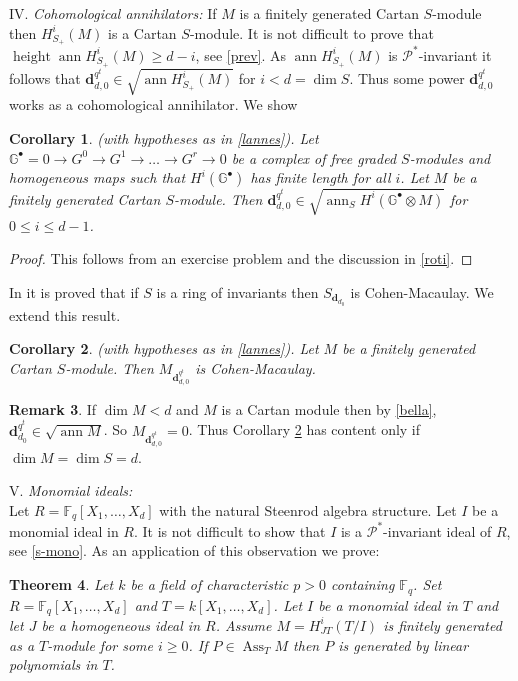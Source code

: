 \documentclass{amsart}
\newcommand{\CM}{Cohen-Macaulay}
\newcommand{\F}{\mathbb{F} }
\newcommand{\Pc}{\mathcal{P} }
\newcommand{\db}{\mathbf{d} }
\newcommand{\rt}{\rightarrow}
\newcommand{\G}{\mathbb{G}^\bullet }
\newcommand{\height}{\operatorname{height}}
\newcommand{\ann}{\operatorname{ann}}
\newcommand{\Ass}{\operatorname{Ass}}
\theoremstyle{plain}
\newtheorem{theorem}{Theorem}[section]
\newtheorem{corollary}[theorem]{Corollary}
\theoremstyle{definition}
\newtheorem{remark}[theorem]{Remark}
\theoremstyle{remark}
\begin{document}
IV. \emph{Cohomological annihilators:}
\s \label{roti} If $M$ is a finitely generated Cartan $S$-module then  $H^i_{S_+}(M)$ is a Cartan $S$-module. It is not difficult to prove that $\height \ann H^i_{S_+}(M) \geq d -i$, see \ref{prev}. As $\ann H^i_{S_+}(M)$ is $\Pc^*$-invariant it follows that $\db_{d,0}^{q^t} \in \sqrt{\ann H^i_{S_+}(M)} $ for $i < d = \dim S$. Thus some power $\db_{d,0}^{q^t}$ works as a cohomological annihilator. We show
\begin{corollary}
\label{rob} (with hypotheses as in \ref{lannes}). Let $\G = 0 \rt G^0 \rt G^1 \rt \ldots \rt G^r \rt 0$ be a complex of free graded $S$-modules and homogeneous maps such that $H^i(\G)$ has finite length for all $i$. Let $M$ be a finitely generated Cartan $S$-module. Then $\db_{d,0}^{q^t}\in \sqrt{\ann_S H^i(\G\otimes M)}$ for $0 \leq i \leq d-1$.
\end{corollary}
\begin{proof}
  This follows from an exercise problem \cite[8.1.6]{BH} and the discussion in \ref{roti}.
\end{proof}
In \cite[11.5.5]{SL} it is proved that if $S$ is a ring of invariants then $S_{\db_{d_0}}$ is \CM. We extend this result.
\begin{corollary}
  \label{cm} (with hypotheses as in \ref{lannes}).     Let $M$ be a finitely generated Cartan $S$-module. Then $M_{\db_{d,0}^{q^t}}$ is \CM.
\end{corollary}
\begin{remark}\label{sbi}
  If $\dim M < d$ and $M$ is a Cartan module then by \ref{bella}, $\db_{d_0}^{q^t} \in \sqrt{\ann M}$. So $M_{\db_{d,0}^{q^t}} = 0$. Thus Corollary \ref{cm} has content only if
   $\dim M =  \dim S = d$.
\end{remark}

V. \emph{Monomial ideals:}\\
Let $R = \F_q[X_1,\ldots, X_d]$ with the natural Steenrod algebra structure. Let $I$ be a monomial ideal in $R$. It is not difficult to show that $I$ is a $\Pc^*$-invariant ideal of $R$, see \ref{s-mono}. As an application of this observation we prove:
\begin{theorem}
\label{mono} Let $k$ be a field of characteristic $p > 0$ containing $\F_q$. Set $R = \F_q[X_1,\ldots, X_d]$ and $T = k[X_1,\ldots, X_d]$. Let $I$ be a monomial ideal in $T$ and let $J$ be a homogeneous ideal in $R$. Assume $M = H^i_{JT}(T/I)$ is  finitely generated as a $T$-module for some $i \geq 0$. If $P \in \Ass_T M$ then $P$ is generated by linear polynomials in $T$.
\end{theorem}
\end{document}
